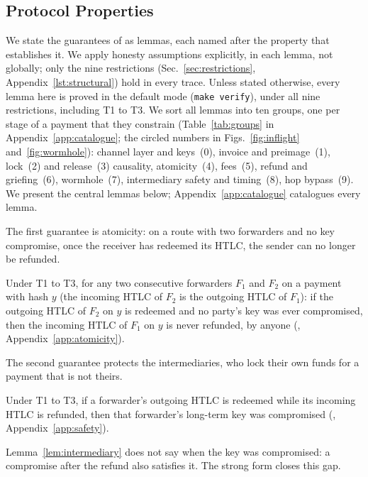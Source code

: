 \subsection{Protocol Properties}\label{sec:properties}

We state the guarantees of  as lemmas, each named after the \tamarin{}
property that establishes it. We apply honesty assumptions explicitly, in each lemma, not
globally; only the nine restrictions (Sec.~\ref{sec:restrictions}, Appendix~\ref{lst:structural})
hold in every trace. Unless
stated otherwise, every lemma here is proved in the default mode (\texttt{make verify}), under all
nine restrictions, including T1 to T3. We sort all lemmas into ten groups, one per stage of a
payment that they constrain (Table~\ref{tab:groups} in Appendix~\ref{app:catalogue}; the circled
numbers in Figs.~\ref{fig:inflight} and~\ref{fig:wormhole}): channel layer and keys~(0), invoice and
preimage~(1), lock~(2) and release~(3) causality, atomicity~(4), fees~(5), refund and
griefing~(6), wormhole~(7), intermediary safety and timing~(8), hop bypass~(9). We present the
central lemmas below; Appendix~\ref{app:catalogue} catalogues every lemma.

The first guarantee is atomicity: on a route with two forwarders and no key compromise, once
the receiver has redeemed its HTLC, the sender can no longer be refunded.

\begin{lemma}\label{lem:atomicity}
Under T1 to T3, for any two consecutive forwarders $F_1$ and $F_2$ on a payment with hash $y$ (the incoming HTLC
of $F_2$ is the outgoing HTLC of $F_1$): if the outgoing HTLC of $F_2$ on $y$ is redeemed and no
party's key was ever compromised, then the incoming HTLC of $F_1$ on $y$ is never refunded, by
anyone (, Appendix~\ref{app:atomicity}).
\end{lemma}

The second guarantee protects the intermediaries, who lock their own funds for a payment that
is not theirs.

\begin{lemma}\label{lem:intermediary}
Under T1 to T3, if a forwarder's outgoing HTLC is redeemed while its incoming HTLC is refunded,
then that forwarder's long-term key was compromised (,
Appendix~\ref{app:safety}).
\end{lemma}
Lemma~\ref{lem:intermediary} does not say when the key was compromised: a compromise after the
refund also satisfies it. The strong form closes this gap.

